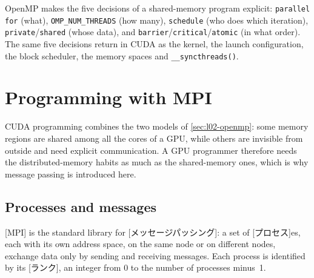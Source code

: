 \documentclass[../main.tex]{subfiles}
\begin{document}
\begin{keypoint}
  OpenMP makes the five decisions of a shared-memory program explicit:
  \texttt{parallel for} (what), \texttt{OMP\_NUM\_THREADS} (how many),
  \texttt{schedule} (who does which iteration), \texttt{private}/\texttt{shared}
  (whose data), and \texttt{barrier}/\texttt{critical}/\texttt{atomic}
  (in what order).  The same five decisions return in CUDA as the kernel,
  the launch configuration, the block scheduler, the memory spaces and
  \texttt{\_\_syncthreads()}.
\end{keypoint}

\section{Programming with MPI}
\label{sec:l02-mpi}

CUDA programming combines the two models of \cref{sec:l02-openmp}: some
memory regions are shared among all the cores of a GPU, while others are
invisible from outside and need explicit communication.  A GPU programmer
therefore needs the distributed-memory habits as much as the shared-memory
ones, which is why message passing is introduced here.

\subsection{Processes and messages}

\begin{definition}[MPI]
  [MPI] is the standard library for
  [メッセージパッシング]: a set of
  [プロセス]es, each with its own address space, on the
  same node or on different nodes, exchange data only by sending and
  receiving messages.
  Each process is identified by its [ランク], an integer from
  0 to the number of processes minus~1.
\end{definition}
\end{document}
